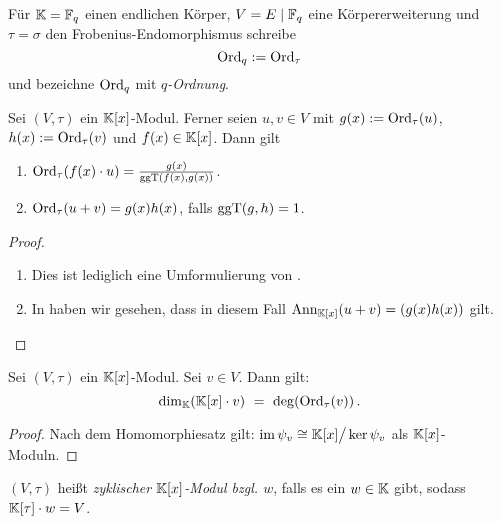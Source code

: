 \begin{notation}
  Für $\mathbb{K} = \mathbb{F}_q$ einen endlichen Körper, $V = E \mid \mathbb{F}_q$ eine 
  Körpererweiterung und $\tau = \sigma$ den Frobenius-Endomorphismus schreibe
  \[ \operatorname{Ord}_q := \operatorname{Ord}_\tau \]
  und bezeichne $\operatorname{Ord}_q$ mit \emph{$q$-Ordnung}.
\end{notation}

\begin{lemma}
  \label{lemma:eigenschaften_tau_ordnung}
  Sei $(V,\tau)$ ein $\mathbb{K}[x]$-Modul. Ferner seien
  $u,v\in V$ mit $g(x) := \operatorname{Ord}_\tau(u)$, $h(x) := \operatorname{Ord}_\tau(v)$ und 
  $f(x) \in \mathbb{K}[x]$. Dann gilt
  \begin{enumerate}
    \item $\operatorname{Ord}_\tau(f(x)\cdot u) = \frac{g(x)}{\operatorname{ggT}(f(x),g(x))}$.
    \item $\operatorname{Ord}_\tau(u+v) = g(x)h(x)$, falls $\operatorname{ggT}(g,h) = 1$.
  \end{enumerate}
\end{lemma}
\begin{proof}
  \begin{enumerate}
    \item Dies ist lediglich eine Umformulierung von
      .
    \item In  haben wir gesehen, dass
      in diesem Fall $\operatorname{Ann}_{\mathbb{K}[x]}(u+v) = (g(x)h(x))$ gilt.
  \end{enumerate}
\end{proof}

\begin{lemma}
  \label{lemma:modul_dim_deg}
  Sei $(V,\tau)$ ein $\mathbb{K}[x]$-Modul. Sei $v\in V$. Dann gilt:
  \[ \dim_\mathbb{K}( \mathbb{K}[x]\cdot v ) \ =\  \deg( \operatorname{Ord}_\tau(v) )\,.\]
\end{lemma}
\begin{proof}
  Nach dem Homomorphiesatz gilt: 
  $ \operatorname{im}\psi_v \cong \mathbb{K}[x] \big/ \ker \psi_v$ als $\mathbb{K}[x]$-Moduln.
\end{proof}


\begin{definition}
  $(V,\tau)$ heißt \emph{zyklischer $\mathbb{K}[x]$-Modul bzgl. $w$}, falls es ein 
  $w\in \mathbb{K}$ gibt, sodass $\mathbb{K}[\tau]\cdot w = V$.
\end{definition}



